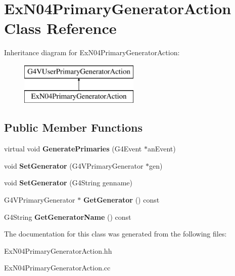 \hypertarget{class_ex_n04_primary_generator_action}{}\section{Ex\+N04\+Primary\+Generator\+Action Class Reference}
\label{class_ex_n04_primary_generator_action}
Inheritance diagram for Ex\+N04\+Primary\+Generator\+Action\+:\begin{figure}[H]
\begin{center}
\leavevmode
\includegraphics[height=2.000000cm]{class_ex_n04_primary_generator_action}
\end{center}
\end{figure}
\subsection*{Public Member Functions}
\begin{DoxyCompactItemize}
\item 
\hypertarget{class_ex_n04_primary_generator_action_a9aad116df9cd1f2fa5ec26b7faba7eb0}{}virtual void {\bfseries Generate\+Primaries} (G4\+Event $\ast$an\+Event)\label{class_ex_n04_primary_generator_action_a9aad116df9cd1f2fa5ec26b7faba7eb0}

\item 
\hypertarget{class_ex_n04_primary_generator_action_aff8fb2ce7b737b6e9242f6fcb506e82d}{}void {\bfseries Set\+Generator} (G4\+V\+Primary\+Generator $\ast$gen)\label{class_ex_n04_primary_generator_action_aff8fb2ce7b737b6e9242f6fcb506e82d}

\item 
\hypertarget{class_ex_n04_primary_generator_action_a0f9df527485e34679aad0708212f6d42}{}void {\bfseries Set\+Generator} (G4\+String genname)\label{class_ex_n04_primary_generator_action_a0f9df527485e34679aad0708212f6d42}

\item 
\hypertarget{class_ex_n04_primary_generator_action_ac055f78ed9d64550d728ec91d589e2b3}{}G4\+V\+Primary\+Generator $\ast$ {\bfseries Get\+Generator} () const \label{class_ex_n04_primary_generator_action_ac055f78ed9d64550d728ec91d589e2b3}

\item 
\hypertarget{class_ex_n04_primary_generator_action_a3f46e479a8104e6cd1f5b701345fb3eb}{}G4\+String {\bfseries Get\+Generator\+Name} () const \label{class_ex_n04_primary_generator_action_a3f46e479a8104e6cd1f5b701345fb3eb}

\end{DoxyCompactItemize}


The documentation for this class was generated from the following files\+:\begin{DoxyCompactItemize}
\item 
Ex\+N04\+Primary\+Generator\+Action.\+hh\item 
Ex\+N04\+Primary\+Generator\+Action.\+cc\end{DoxyCompactItemize}
